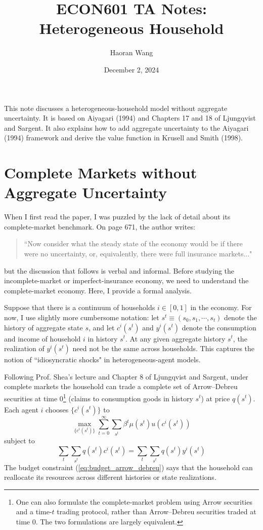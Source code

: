 \documentclass[12pt]{article}
\title{ECON601 TA Notes: Heterogeneous Household}
\author{Haoran Wang }
\date{December 2, 2024}
\begin{document}
	\maketitle
	
	\tableofcontents

This note discusses a heterogeneous-household model without aggregate uncertainty. It is based on Aiyagari (1994) and Chapters 17 and 18 of Ljungqvist and Sargent. It also explains how to add aggregate uncertainty to the Aiyagari (1994) framework and derive the value function in Krusell and Smith (1998).

\section{Complete Markets without Aggregate Uncertainty}

When I first read the paper, I was puzzled by the lack of detail about its complete-market benchmark. On page 671, the author writes:
\begin{quote}
	``Now consider what the steady state of the economy would be if there were no uncertainty, or, equivalently, there were full insurance markets..."
\end{quote}
but the discussion that follows is verbal and informal. Before studying the incomplete-market or imperfect-insurance economy, we need to understand the complete-market economy. Here, I provide a formal analysis.

Suppose that there is a continuum of households $i \in [0,1]$ in the economy. For now, I use slightly more cumbersome notation: let $s^t \equiv (s_0, s_1, \cdots, s_t)$ denote the history of aggregate state $s$, and let $c^i(s^t)$ and $y^i(s^t)$ denote the consumption and income of household $i$ in history $s^t$. At any given aggregate history $s^t$, the realization of $y^i(s^t)$ need not be the same across households. This captures the notion of ``idiosyncratic shocks" in heterogeneous-agent models.

Following Prof. Shea's lecture and Chapter 8 of Ljungqvist and Sargent, under complete markets the household can trade a complete set of Arrow--Debreu securities at time 0\footnote{One can also formulate the complete-market problem using Arrow securities and a time-$t$ trading protocol, rather than Arrow--Debreu securities traded at time 0. The two formulations are largely equivalent.} (claims to consumption goods in history $s^t$) at price $q(s^t)$. Each agent $i$ chooses $\{c^i(s^t)\}$ to
\begin{equation}
	\max_{\{c^i(s^t)\}}\sum_{t=0}^\infty \sum_{s^t} \beta^t \mu(s^t) u(c^i(s^t))
\end{equation}
subject to
\begin{equation} \label{eq:budget_arrow_debreu}
	\sum_{t} \sum_{s^t} q(s^t) c^i(s^t) = \sum_t \sum_{s^t} q(s^t) y^i(s^t)
\end{equation}
The budget constraint (\ref{eq:budget_arrow_debreu}) says that the household can reallocate its resources across different histories or state realizations. 
\end{document}
